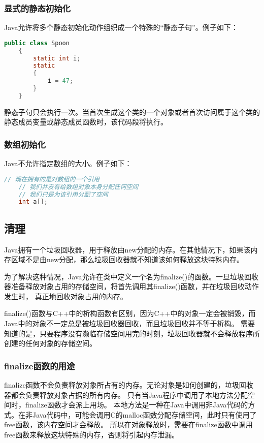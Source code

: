 \documentclass[a4paper,left=2.5cm,right=2.5cm,11pt]{article}
\begin{document}
\subsubsection{显式的静态初始化}
	Java允许将多个静态初始化动作组织成一个特殊的“静态子句”。例子如下：
	\begin{lstlisting}[language = Java]
	public class Spoon
	{
		static int i;
		static
		{
			i = 47;
		}
	}
	\end{lstlisting}

	静态子句只会执行一次。当首次生成这个类的一个对象或者首次访问属于这个类的静态成员变量或静态成员函数时，该代码段将执行。

\subsubsection{数组初始化}
	Java不允许指定数组的大小。例子如下：
	\begin{lstlisting}[language = C]
	// 现在拥有的是对数组的一个引用
	// 我们并没有给数组对象本身分配任何空间
	// 我们只是为该引用分配了空间
	int a[];
	\end{lstlisting}

\subsection{清理}
	Java拥有一个垃圾回收器，用于释放由new分配的内存。在其他情况下，如果该内存区域不是由new分配，那么垃圾回收器就不知道该如何释放这块特殊内存。\par
	为了解决这种情况，Java允许在类中定义一个名为finalize()的函数。一旦垃圾回收器准备释放对象占用的存储空间，将首先调用其finalize()函数，并在垃圾回收动作发生时，
	真正地回收对象占用的内存。\par
	finalize()函数与C++中的析构函数有区别，因为C++中的对象一定会被销毁，而Java中的对象不一定总是被垃圾回收器回收，而且垃圾回收并不等于析构。
	需要知道的是，只要程序没有濒临存储空间用完的时刻，垃圾回收器就不会释放程序所创建的任何对象的存储空间。\par

\subsubsection{finalize函数的用途}
	finalize函数不会负责释放对象所占有的内存。无论对象是如何创建的，垃圾回收器都会负责释放对象占据的所有内存。
	只有当Java程序中调用了本地方法分配空间时，finalize函数才会派上用场。
	本地方法是一种在Java中调用非Java代码的方式。在非Java代码中，可能会调用C的malloc函数分配存储空间，此时只有使用了free函数，该内存空间才会释放。
	所以在对象释放时，需要在finalize函数中调用free函数来释放这块特殊的内存，否则将引起内存泄漏。\par
\end{document}

